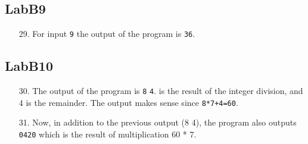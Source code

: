 \documentclass{article}
\begin{document}
\subsection{LabB9}
\begin{enumerate}
\item[29. ] For input \verb$9$ the output of the program is \verb$36$.
\end{enumerate}

\subsection{LabB10}
\begin{enumerate}
\item[30. ] The output of the program is \verb$8$ \verb$4$. is the result of the integer division, and 4 is the remainder.
The output makes sense since \verb$8*7+4=60$.
\item[31. ] Now, in addition to the previous output (8 4), the program also outputs \verb$0420$ which is the result of multiplication 60 * 7.
\end{enumerate}
\end{document}

